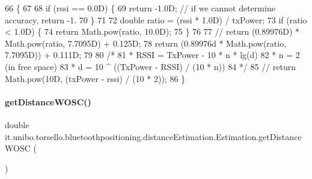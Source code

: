 \begin{DoxyCode}
66                                                                   \{
67 
68         \textcolor{keywordflow}{if} (rssi == 0.0D) \{
69             \textcolor{keywordflow}{return} -1.0D; \textcolor{comment}{// if we cannot determine accuracy, return -1.}
70         \}
71 
72         \textcolor{keywordtype}{double} ratio = (rssi * 1.0D) / txPower;
73         \textcolor{keywordflow}{if} (ratio < 1.0D) \{
74             \textcolor{keywordflow}{return} Math.pow(ratio, 10.0D);
75         \}
76 
77 \textcolor{comment}{//        return (0.89976D) * Math.pow(ratio, 7.7095D) + 0.125D;}
78         \textcolor{keywordflow}{return} (0.89976d * Math.pow(ratio, 7.7095D)) + 0.111D;
79 
80     \textcolor{comment}{/*}
81 \textcolor{comment}{     * RSSI = TxPower - 10 * n * lg(d)}
82 \textcolor{comment}{     * n = 2 (in free space)}
83 \textcolor{comment}{     * d = 10 ^ ((TxPower - RSSI) / (10 * n))}
84 \textcolor{comment}{     */}
85         \textcolor{comment}{// return Math.pow(10D, (txPower - rssi) / (10 * 2));}
86     \}
\end{DoxyCode}
\hypertarget{classit_1_1unibo_1_1torsello_1_1bluetoothpositioning_1_1distanceEstimation_1_1Estimation_a5c7bce21cd77c98a8d1e6df4c930397c_a5c7bce21cd77c98a8d1e6df4c930397c}{}\label{classit_1_1unibo_1_1torsello_1_1bluetoothpositioning_1_1distanceEstimation_1_1Estimation_a5c7bce21cd77c98a8d1e6df4c930397c_a5c7bce21cd77c98a8d1e6df4c930397c} 
\paragraph{\texorpdfstring{get\+Distance\+W\+O\+S\+C()}{getDistanceWOSC()}}
{\footnotesize\ttfamily double it.\+unibo.\+torsello.\+bluetoothpositioning.\+distance\+Estimation.\+Estimation.\+get\+Distance\+W\+O\+SC (\begin{DoxyParamCaption}{ }\end{DoxyParamCaption})}


